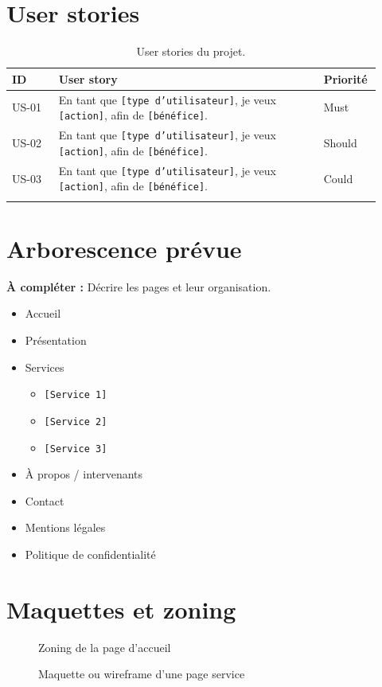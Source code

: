 \documentclass[11pt,a4paper]{report}
\newcommand{\placeholder}[1]{\textcolor{placeholderColor}{\texttt{[#1]}}}
\newcommand{\todo}[1]{\textcolor{todoColor}{\textbf{À compléter :} #1}}
\newcommand{\blankspace}[1]{\vspace*{#1}}
\newcommand{\imageplaceholder}[4][0.85\linewidth]{%
  \begin{figure}[H]
    \centering
    \fbox{%
      \begin{minipage}[c][#2][c]{#1}
        \centering
        \textcolor{midgray}{\Large Emplacement image}\\[0.4cm]
        \textcolor{midgray}{#3}
      \end{minipage}%
    }
    \caption{#3}
    \label{#4}
  \end{figure}
}
\begin{document}
\section{User stories}
\begin{longtable}{p{0.12\linewidth}p{0.68\linewidth}p{0.12\linewidth}}
\toprule
\textbf{ID} & \textbf{User story} & \textbf{Priorité} \\
\midrule
\endhead
US-01 & En tant que \placeholder{type d'utilisateur}, je veux \placeholder{action}, afin de \placeholder{bénéfice}. & Must \\
US-02 & En tant que \placeholder{type d'utilisateur}, je veux \placeholder{action}, afin de \placeholder{bénéfice}. & Should \\
US-03 & En tant que \placeholder{type d'utilisateur}, je veux \placeholder{action}, afin de \placeholder{bénéfice}. & Could \\
\bottomrule
\caption{User stories du projet.}
\label{tab:user-stories}
\end{longtable}

\section{Arborescence prévue}
\todo{Décrire les pages et leur organisation.}
\begin{itemize}[leftmargin=*]
  \item Accueil
  \item Présentation
  \item Services
  \begin{itemize}
    \item \placeholder{Service 1}
    \item \placeholder{Service 2}
    \item \placeholder{Service 3}
  \end{itemize}
  \item À propos / intervenants
  \item Contact
  \item Mentions légales
  \item Politique de confidentialité
\end{itemize}
\blankspace{4cm}

\section{Maquettes et zoning}
\imageplaceholder{8cm}{Zoning de la page d'accueil}{fig:zoning-accueil}
\imageplaceholder{8cm}{Maquette ou wireframe d'une page service}{fig:wireframe-service}
\end{document}
